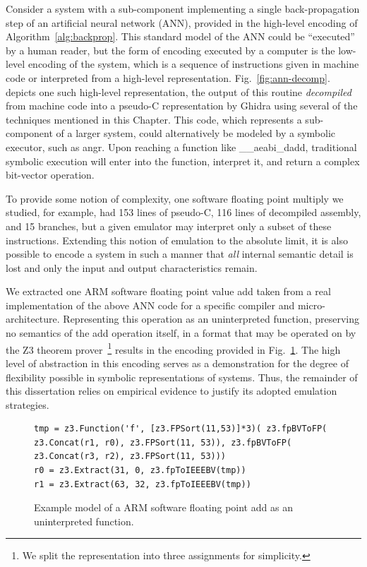 \begin{example}
Consider a system with a sub-component implementing a single back-propagation step of an artificial neural network (ANN), provided in the high-level encoding of Algorithm~\ref{alg:backprop}.
This standard model of the ANN could be ``executed'' by a human reader, but the form of encoding executed by a computer is the low-level encoding of the system, which is a sequence of instructions given in machine code or interpreted from a high-level representation.
Fig.~\ref{fig:ann-decomp}. depicts one such high-level representation, the output of this routine \emph{decompiled} from machine code into a pseudo-C representation by Ghidra using several of the techniques mentioned in this Chapter.
This code, which represents a sub-component of a larger system, could alternatively be modeled by a symbolic executor, such as angr.
Upon reaching a function like \_\_aeabi\_dadd, traditional symbolic execution will enter into the function, interpret it, and return a complex bit-vector operation.

To provide some notion of complexity, one software floating point multiply we studied, for example, had 153 lines of pseudo-C, 116 lines of decompiled assembly, and 15 branches, but a given emulator may interpret only a subset of these instructions.
Extending this notion of emulation to the absolute limit, it is also possible to encode a system in such a manner that \emph{all} internal semantic detail is lost and only the input and output characteristics remain.

We extracted one ARM software floating point value add taken from a real implementation of the above ANN code for a specific compiler and micro-architecture.
Representing this operation as an uninterpreted function, preserving no semantics of the add operation itself, in a format that may be operated on by the Z3 theorem prover~\cite{zthree}\footnote{We split the representation into three assignments for simplicity.} results in the encoding provided in Fig.~\ref{fig:ann-spec}.
The high level of abstraction in this encoding serves as a demonstration for the degree of flexibility possible in symbolic representations of systems.
Thus, the remainder of this dissertation relies on empirical evidence to justify its adopted emulation strategies.

\begin{figure}
  \begin{lstlisting}
tmp = z3.Function('f', [z3.FPSort(11,53)]*3)( z3.fpBVToFP( z3.Concat(r1, r0), z3.FPSort(11, 53)), z3.fpBVToFP( z3.Concat(r3, r2), z3.FPSort(11, 53)))
r0 = z3.Extract(31, 0, z3.fpToIEEEBV(tmp))
r1 = z3.Extract(63, 32, z3.fpToIEEEBV(tmp))
  \end{lstlisting}
	\caption{Example model of a ARM software floating point add as an uninterpreted function.}
  \label{fig:ann-spec}
\end{figure}

\end{example}

